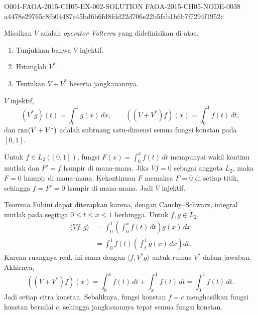 \begin{o001solution}
  {O001-FAOA-2015-CH05-EX-002-SOLUTION}
  {FAOA-2015-CH05-NODE-0038}
  {a4478e29765c8fb04487e45bd6b6fd8fdd22d706e22b5fab1b6b7f7294f1952c}
\begin{o001statement}
Misalkan $V$ adalah \emph{operator Volterra} yang didefinisikan di atas.
 \begin{enumerate}
  \item[(a)] Tunjukkan bahwa $V$ injektif.
  \item[(b)] Hitunglah $V^*$.
  \item[(c)] Tentukan $V + V^*$ beserta jangkauannya.
 \end{enumerate}
\end{o001statement}
\begin{o001answer}
$V$ injektif,
\[
 (V^*g)(t)=\int_t^1g(x)\,dx,
 \qquad
 ((V+V^*)f)(x)=\int_0^1f(t)\,dt,
\]
dan $\operatorname{ran}(V+V^*)$ adalah subruang satu-dimensi semua fungsi konstan pada
$[0,1]$.
\end{o001answer}
\begin{o001proof}
Untuk $f\in L_2([0,1])$, fungsi
$F(x)=\int_0^x f(t)\,dt$ mempunyai wakil kontinu mutlak dan $F'=f$ hampir
di mana-mana. Jika $Vf=0$ sebagai anggota $L_2$, maka $F=0$ hampir di
mana-mana. Kekontinuan $F$ memaksa $F=0$ di setiap titik, sehingga
$f=F'=0$ hampir di mana-mana. Jadi $V$ injektif.

Teorema Fubini dapat diterapkan karena, dengan Cauchy--Schwarz, integral
mutlak pada segitiga $0\leq t\leq x\leq1$ berhingga. Untuk $f,g\in L_2$,
\begin{align*}
 \langle Vf,g\rangle
 &=\int_0^1\left(\int_0^x f(t)\,dt\right)g(x)\,dx\\
 &=\int_0^1 f(t)\left(\int_t^1g(x)\,dx\right)dt.
\end{align*}
Karena ruangnya real, ini sama dengan
$\langle f,V^*g\rangle$ untuk rumus $V^*$ dalam jawaban. Akhirnya,
\[
 ((V+V^*)f)(x)
 =\int_0^xf(t)\,dt+\int_x^1f(t)\,dt
 =\int_0^1f(t)\,dt.
\]
Jadi setiap citra konstan. Sebaliknya, fungsi konstan $f=c$ menghasilkan
fungsi konstan bernilai $c$, sehingga jangkauannya tepat semua fungsi
konstan.
\end{o001proof}
\end{o001solution}

